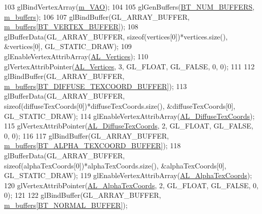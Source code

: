 \begin{DoxyCode}
103   glBindVertexArray(\hyperlink{class_renderable_object_adf71c359139a157f0513f06a04d6a81d}{m\_VAO});
104 
105   glGenBuffers(\hyperlink{_renderable_object_8h_a3e5d410ec73ff739b77335fae2a20d37ad7826b7cb87e89d794e8e1f9c9464730}{BT\_NUM\_BUFFERS}, \hyperlink{class_renderable_object_abee52bb51bcb4392073cbb890d39a216}{m\_buffers});
106 
107   glBindBuffer(GL\_ARRAY\_BUFFER, \hyperlink{class_renderable_object_abee52bb51bcb4392073cbb890d39a216}{m\_buffers}[\hyperlink{_renderable_object_8h_a3e5d410ec73ff739b77335fae2a20d37aa11b72abb523f90569d5f0fb549a55a6}{BT\_VERTEX\_BUFFER}]);
108   glBufferData(GL\_ARRAY\_BUFFER, \textcolor{keyword}{sizeof}(vertices[0])*vertices.size(), &vertices[0], GL\_STATIC\_DRAW);
109   glEnableVertexAttribArray(\hyperlink{_shader_8h_abeea86fa7b6213f5a961556c17de93c8a8c634dc1801c5734bb1be0648d71149d}{AL\_Vertices});
110   glVertexAttribPointer(\hyperlink{_shader_8h_abeea86fa7b6213f5a961556c17de93c8a8c634dc1801c5734bb1be0648d71149d}{AL\_Vertices}, 3, GL\_FLOAT, GL\_FALSE, 0, 0);
111 
112   glBindBuffer(GL\_ARRAY\_BUFFER, \hyperlink{class_renderable_object_abee52bb51bcb4392073cbb890d39a216}{m\_buffers}[\hyperlink{_renderable_object_8h_a3e5d410ec73ff739b77335fae2a20d37af273b1e9fb59302fbdebc3a36a6dca8f}{BT\_DIFFUSE\_TEXCOORD\_BUFFER}]);
113   glBufferData(GL\_ARRAY\_BUFFER, \textcolor{keyword}{sizeof}(diffuseTexCoords[0])*diffuseTexCoords.size(), &diffuseTexCoords[0], 
      GL\_STATIC\_DRAW);
114   glEnableVertexAttribArray(\hyperlink{_shader_8h_abeea86fa7b6213f5a961556c17de93c8a1e6842dedef2c2ca1f605ece408f4150}{AL\_DiffuseTexCoords});
115   glVertexAttribPointer(\hyperlink{_shader_8h_abeea86fa7b6213f5a961556c17de93c8a1e6842dedef2c2ca1f605ece408f4150}{AL\_DiffuseTexCoords}, 2, GL\_FLOAT, GL\_FALSE, 0, 0);
116 
117   glBindBuffer(GL\_ARRAY\_BUFFER, \hyperlink{class_renderable_object_abee52bb51bcb4392073cbb890d39a216}{m\_buffers}[\hyperlink{_renderable_object_8h_a3e5d410ec73ff739b77335fae2a20d37aff64c08efc91b377c73ecd46b5951c74}{BT\_ALPHA\_TEXCOORD\_BUFFER}]);
118   glBufferData(GL\_ARRAY\_BUFFER, \textcolor{keyword}{sizeof}(alphaTexCoords[0])*alphaTexCoords.size(), &alphaTexCoords[0], 
      GL\_STATIC\_DRAW);
119   glEnableVertexAttribArray(\hyperlink{_shader_8h_abeea86fa7b6213f5a961556c17de93c8a1e275e6ee0726ebc900fadbc0d7b63c1}{AL\_AlphaTexCoords});
120   glVertexAttribPointer(\hyperlink{_shader_8h_abeea86fa7b6213f5a961556c17de93c8a1e275e6ee0726ebc900fadbc0d7b63c1}{AL\_AlphaTexCoords}, 2, GL\_FLOAT, GL\_FALSE, 0, 0);
121 
122   glBindBuffer(GL\_ARRAY\_BUFFER, \hyperlink{class_renderable_object_abee52bb51bcb4392073cbb890d39a216}{m\_buffers}[\hyperlink{_renderable_object_8h_a3e5d410ec73ff739b77335fae2a20d37a8513059d34b0247dd4b188fee7eb18c8}{BT\_NORMAL\_BUFFER}]);

\end{DoxyCode}
